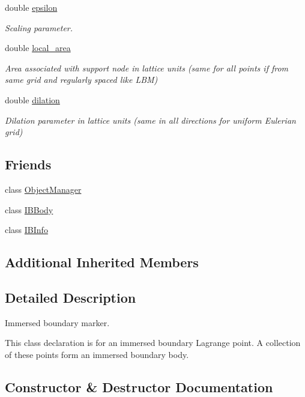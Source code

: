 \begin{DoxyCompactItemize}
double \hyperlink{class_i_b_marker_a8127c61f723299ba0bf04439c1fb1c1e}{epsilon}
\begin{DoxyCompactList}\small\item\em Scaling parameter. \end{DoxyCompactList}\item 
double \hyperlink{class_i_b_marker_aa332dcba1676eae4fbb6d0fa6caca809}{local\+\_\+area}
\begin{DoxyCompactList}\small\item\em Area associated with support node in lattice units (same for all points if from same grid and regularly spaced like L\+BM) \end{DoxyCompactList}\item 
double \hyperlink{class_i_b_marker_a5c908a7e52fc0b2dccbaa277f37b7c22}{dilation}
\begin{DoxyCompactList}\small\item\em Dilation parameter in lattice units (same in all directions for uniform Eulerian grid) \end{DoxyCompactList}\end{DoxyCompactItemize}
\subsection*{Friends}
\begin{DoxyCompactItemize}
\item 
class \hyperlink{class_i_b_marker_a8b86bdcdb7c54a536293d8632363e114}{Object\+Manager}
\item 
class \hyperlink{class_i_b_marker_a5d93aa5aec680a2b395a71266fe4ac92}{I\+B\+Body}
\item 
class \hyperlink{class_i_b_marker_a54980b051e93ff6b0f02df2ff7fee3a8}{I\+B\+Info}
\end{DoxyCompactItemize}
\subsection*{Additional Inherited Members}


\subsection{Detailed Description}
Immersed boundary marker. 

This class declaration is for an immersed boundary Lagrange point. A collection of these points form an immersed boundary body. 

\subsection{Constructor \& Destructor Documentation}
